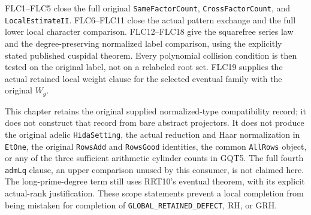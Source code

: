 \documentclass[11pt,a4paper]{article}
\numberwithin{equation}{section}
\theoremstyle{remark}\newtheorem{remark}[theorem]{Remark}
\begin{document}
FLC1--FLC5 close the full original \texttt{Same\allowbreak Factor\allowbreak Count},
\texttt{Cross\allowbreak Factor\allowbreak Count}, and \texttt{Local\allowbreak Estimate\allowbreak II}.
FLC6--FLC11 close the actual pattern exchange and the full
lower local character comparison.  FLC12--FLC18 give the
squarefree series law and the degree-preserving normalized
label comparison, using the explicitly stated published
cuspidal theorem.  Every polynomial collision condition is
then tested on the original label, not on a relabeled root
set.  FLC19 supplies the actual retained local weight clause
for the selected eventual family with the original $W_g$.

This chapter retains the original supplied normalized-type
compatibility record; it does not construct that record from
bare abstract projectors.  It does not produce the original
adelic \texttt{Hida\allowbreak Setting}, the actual reduction and Haar
normalization in \texttt{Et\allowbreak One}, the original
\texttt{Rows\allowbreak Add} and \texttt{Rows\allowbreak Good} identities, the common
\texttt{All\allowbreak Rows} object, or any of the three sufficient
arithmetic cylinder counts in GQT5.  The full fourth
\texttt{adm\allowbreak Lq} clause, an upper comparison unused by this
consumer, is not claimed here.  The long-prime-degree term
still uses RRT10's eventual theorem, with its explicit
actual-rank justification.  These scope statements prevent
a local completion from being mistaken for completion of
\texttt{GLOBAL\_\allowbreak RETAINED\_\allowbreak DEFECT}, RH, or GRH.

\endgroup
\end{document}
